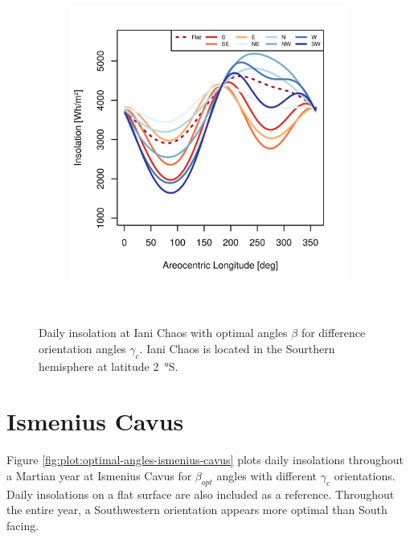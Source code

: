 \begin{figure}[h]
\begin{subfigure}[t]{\subfigureWidth}
            \includegraphics[height=\graphicsHeight]{sections/appendix/optimal-angles/plots/iani-chaos-tau-04-and-beta-optimal-based-on-solar-insolation.png}
            \label{fig:sub:optimal-angles-iani-chaos-based-on-insolation}
    \end{subfigure}\\[0.8ex]
    \caption[Daily insolation at Iani Chaos with optimal angles $\beta$ for difference orientation angles $\gamma_c$]
    {Daily insolation at Iani Chaos with optimal angles $\beta$ for difference orientation angles $\gamma_c$. Iani Chaos is located in the Sourthern hemisphere at latitude \SI{2}{\degree}S.}
    \label{fig:plot:optimal-angles-iani-chaos}
\vspace{-2ex}
\end{figure}

\section{Ismenius Cavus}

Figure \ref{fig:plot:optimal-angles-ismenius-cavus} plots daily insolations throughout a Martian year at Ismenius Cavus for $\beta_{opt}$ angles with different $\gamma_{c}$ orientations. Daily insolations on a flat surface are also included as a reference. Throughout the entire year, a Southwestern orientation appears more optimal than South facing.

